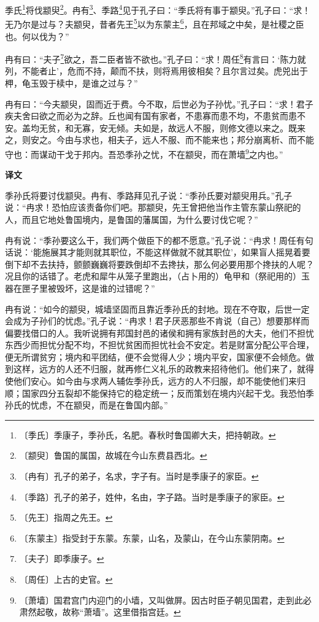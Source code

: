 \documentclass[12pt,UTF-8,openany,a4]{ctexbook}
\begin{document}
\begin{large}
    
    季氏\footnote{〔季氏〕\yiwen 季康子，季孙氏，名肥。春秋时鲁国卿大夫，把持朝政。}将伐颛臾\footnote{〔颛臾〕\yiwen 鲁国的属国，故城在今山东费县西北。}。冉有\footnote{〔冉有〕\yiwen 孔子的弟子，名求，字子有。当时是季康子的家臣。}、季路\footnote{〔季路〕\yiwen 孔子的弟子，姓仲，名由，字子路。当时是季康子的家臣。}见于孔子曰：“季氏将有事于颛臾。”孔子曰：“求！无乃尔是过与？夫颛臾，昔者先王\footnote{〔先王〕\yiwen 指周之先王。}以为东蒙主\footnote{〔东蒙主〕\yiwen 指受封于东蒙。东蒙，山名，及蒙山，在今山东蒙阴南。}，且在邦域之中矣，是社稷之臣也。何以伐为？”
    
    冉有曰：“夫子\footnote{〔夫子〕\yiwen 即季康子。}欲之，吾二臣者皆不欲也。”孔子曰：“求！周任\footnote{〔周任〕\yiwen 上古的史官。}有言曰：‘陈力就列，不能者止’，危而不持，颠而不扶，则将焉用彼相矣？且尔言过矣。虎兕出于柙，龟玉毁于椟中，是谁之过与？”
    
    冉有曰：“今夫颛臾，固而近于费。今不取，后世必为子孙忧。”孔子曰：“求！君子疾夫舍曰欲之而必为之辞。丘也闻有国有家者，不患寡而患不均，不患贫而患不安。盖均无贫，和无寡，安无倾。夫如是，故远人不服，则修文德以来之。既来之，则安之。今由与求也，相夫子，远人不服、而不能来也；邦分崩离析、而不能守也：而谋动干戈于邦内。吾恐季孙之忧，不在颛臾，而在萧墙\footnote{〔萧墙〕\yiwen 国君宫门内迎门的小墙，又叫做屏。因古时臣子朝见国君，走到此必肃然起敬，故称“萧墙”。这里借指宫廷。}之内也。”
\end{large}


\newpage

\begin{Large}
    \noindent\textbf{译文}
\end{Large}


\vspace{1em}

\begin{large}
    \yiwen 
    季孙氏将要讨伐颛臾。冉有、季路拜见孔子说：“季孙氏要对颛臾用兵。”孔子说：“冉求！恐怕应该责备你们吧。那颛臾，先王曾把他当作主管东蒙山祭祀的人，而且它地处鲁国境内，是鲁国的藩属国，为什么要讨伐它呢？”
    
    冉有说：“季孙要这么干，我们两个做臣下的都不愿意。”孔子说：“冉求！周任有句话说：‘能施展其才能则就其职位，不能这样做就不就其职位’，如果盲人摇晃着要倒下却不去扶持，颤颤巍巍将要跌倒却不去搀扶，那么何必要用那个搀扶的人呢？况且你的话错了。老虎和犀牛从笼子里跑出，（占卜用的）龟甲和（祭祀用的）玉器在匣子里被毁坏，这是谁的过错呢？”
    
    冉有说：“如今的颛臾，城墙坚固而且靠近季孙氏的封地。现在不夺取，后世一定会成为子孙们的忧虑。”孔子说：“冉求！君子厌恶那些不肯说（自己）想要那样而偏要找借口的人。我听说拥有邦国封邑的诸侯和拥有家族封邑的大夫，他们不担忧东西少而担忧分配不均，不担忧贫困而担忧社会不安定。若是财富分配公平合理，便无所谓贫穷；境内和平团结，便不会觉得人少；境内平安，国家便不会倾危。做到这样，远方的人还不归服，就再修仁义礼乐的政教来招待他们。他们来了，就得使他们安心。如今由与求两人辅佐季孙氏，远方的人不归服，却不能使他们来归顺；国家四分五裂却不能保持它的稳定统一；反而策划在境内兴起干戈。我恐怕季孙氏的忧虑，不在颛臾，而是在鲁国内部。”
    
\end{large}
\end{document}
